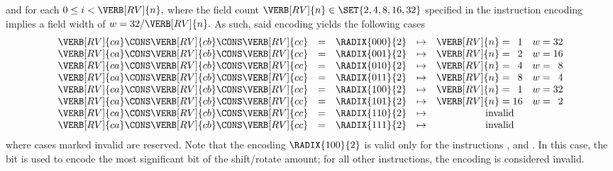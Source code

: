 \noindent
and for each 
$
0 \leq i < \VERB[RV]{n} ,
$ 
where the field count
$
\VERB[RV]{n} \in \SET{ 2, 4, 8, 16, 32 }
$ 
specified in the instruction encoding implies a field width of 
$
w = 32 / \VERB[RV]{n} .
$
As such, said encoding yields the following cases
\[
\begin{array}{ccrcc@{\;}c@{\;}rc@{\;}c@{\;}r}
\VERB[RV]{ca} \CONS \VERB[RV]{cb} \CONS \VERB[RV]{cc} &=& \RADIX{000}{2} &\mapsto& \VERB[RV]{n} &=&  1 & w &=& 32     \\
\VERB[RV]{ca} \CONS \VERB[RV]{cb} \CONS \VERB[RV]{cc} &=& \RADIX{001}{2} &\mapsto& \VERB[RV]{n} &=&  2 & w &=& 16     \\
\VERB[RV]{ca} \CONS \VERB[RV]{cb} \CONS \VERB[RV]{cc} &=& \RADIX{010}{2} &\mapsto& \VERB[RV]{n} &=&  4 & w &=&  8     \\
\VERB[RV]{ca} \CONS \VERB[RV]{cb} \CONS \VERB[RV]{cc} &=& \RADIX{011}{2} &\mapsto& \VERB[RV]{n} &=&  8 & w &=&  4     \\
\VERB[RV]{ca} \CONS \VERB[RV]{cb} \CONS \VERB[RV]{cc} &=& \RADIX{100}{2} &\mapsto& \VERB[RV]{n} &=&  1 & w &=& 32     \\
\VERB[RV]{ca} \CONS \VERB[RV]{cb} \CONS \VERB[RV]{cc} &=& \RADIX{101}{2} &\mapsto& \VERB[RV]{n} &=& 16 & w &=&  2     \\
\VERB[RV]{ca} \CONS \VERB[RV]{cb} \CONS \VERB[RV]{cc} &=& \RADIX{110}{2} &\mapsto& \multicolumn{6}{c}{\mbox{invalid}} \\
\VERB[RV]{ca} \CONS \VERB[RV]{cb} \CONS \VERB[RV]{cc} &=& \RADIX{111}{2} &\mapsto& \multicolumn{6}{c}{\mbox{invalid}} \\
\end{array}
\]
where cases marked invalid are reserved.  Note that the encoding 
$
\RADIX{100}{2}
$
is valid only for the instructions
,
 and
.
In this case, the  bit is used to encode the most significant
bit of the shift/rotate amount; for all other instructions, the encoding
is considered invalid.



